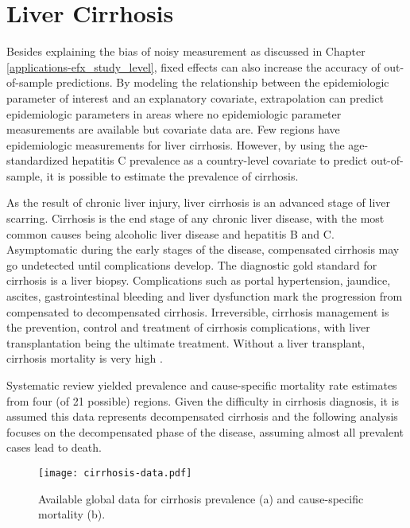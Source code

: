 \chapter{Liver Cirrhosis}
\label{applications-efx_country_level}

Besides explaining the bias of noisy measurement as discussed in Chapter \ref{applications-efx_study_level}, fixed effects can also increase the accuracy of out-of-sample predictions.  By modeling the relationship between the epidemiologic parameter of interest and an explanatory covariate, extrapolation can predict epidemiologic parameters in areas where no epidemiologic parameter measurements are available but covariate data are.  Few regions have epidemiologic measurements for liver cirrhosis.  However, by using the age-standardized hepatitis C prevalence as a country-level covariate to predict out-of-sample, it is possible to estimate the prevalence of cirrhosis.

As the result of chronic liver injury, liver cirrhosis is an advanced stage of liver scarring.  Cirrhosis is the end stage of any chronic liver disease, with the most common causes being alcoholic liver disease and hepatitis B and C.  Asymptomatic during the early stages of the disease, compensated cirrhosis may go undetected until complications develop.  The diagnostic gold standard for cirrhosis is a liver biopsy.  Complications such as portal hypertension, jaundice, ascites, gastrointestinal bleeding and liver dysfunction mark the progression from compensated to decompensated cirrhosis.  Irreversible, cirrhosis management is the prevention, control and treatment of cirrhosis complications, with liver transplantation being the ultimate treatment.  Without a liver transplant, cirrhosis mortality is very high \cite{garcia-tsao_management_2009, d'amico_natural_2006, schuppan_liver_2008}.

Systematic review yielded prevalence and cause-specific mortality rate estimates from four (of 21 possible) regions.  Given the difficulty in cirrhosis diagnosis, it is assumed this data represents decompensated cirrhosis and the following analysis focuses on the decompensated phase of the disease, assuming almost all prevalent cases lead to death.

    \begin{figure}[h]
        \begin{center}
            \texttt{[image: cirrhosis-data.pdf]}
            \caption{Available global data for cirrhosis prevalence (a) and cause-specific mortality (b).}
            \label{fig:app-cirrhosis data}
        \end{center}
    \end{figure}

